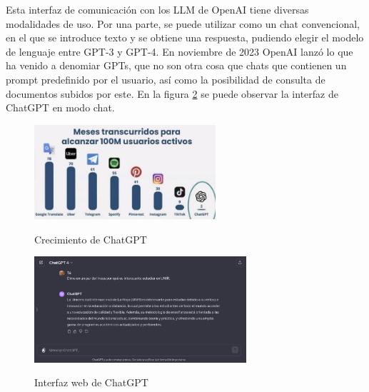         Esta interfaz de comunicación con los LLM de OpenAI tiene diversas modalidades de uso. Por una parte, se puede utilizar como un chat convencional, en el que se introduce texto y se obtiene una respuesta, pudiendo elegir el modelo de lenguaje entre GPT-3 y GPT-4. En noviembre de 2023 OpenAI lanzó lo que ha venido a denomiar GPTs, que no son otra cosa que chats que contienen un prompt predefinido por el usuario, así como la posibilidad de consulta de documentos subidos por este. En la figura \ref{fig:chatgpt} se puede observar la interfaz de ChatGPT en modo chat.

        \begin{figure}[h]
            \caption[Crecimiento de ChatGPT]{Crecimiento de ChatGPT}
            \centering
            \includegraphics[width=0.6\textwidth]{./figuras/100millonesUsuariosChatgpt.jpeg}
            \label{fig:crecimiento_chatgpt}
        \end{figure}

        \begin{figure}[h]
            \caption[Interfaz web de ChatGPT]{Interfaz web de ChatGPT}
            \centering
            \includegraphics[width=0.7\textwidth]{./figuras/interfaz_chatgpt.png}
            \label{fig:chatgpt}
        \end{figure}

